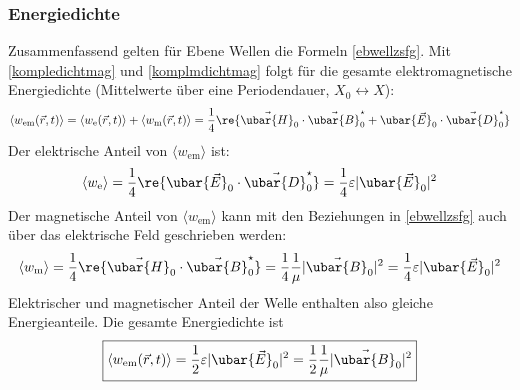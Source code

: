 	  \subsubsection{Energiedichte}
	  Zusammenfassend gelten für Ebene Wellen die Formeln \ref{ebwellzsfg}. Mit \ref{kompledichtmag} und \ref{komplmdichtmag} folgt für die gesamte elektromagnetische Energiedichte (Mittelwerte über eine Periodendauer, $X_0\leftrightarrow X$):
	  \begin{equation}
	  	\langle   w_\mathrm{em}(\vec{r} , t)\rangle = \langle   w_\mathrm{e}(\vec{r} , t)\rangle + \langle   w_\mathrm{m}(\vec{r} , t)\rangle = \frac{1}{4}\re{\vec{\ubar{H}}_0 \cdot \vec{\ubar{B}}_0^\star + \ubar{\vec{E}}_0 \cdot \vec{\ubar{D}}_0^\star}
	  \end{equation}
	  Der elektrische Anteil von \(\langle   w_\mathrm{em}\rangle\) ist: \begin{equation}
	  	\langle   w_\mathrm{e}\rangle  = \frac{1}{4}\re{\ubar{\vec{E}}_0 \cdot \vec{\ubar{D}}_0^\star} = \frac{1}{4} \varepsilon |\ubar{\vec{E}}_0|^2
	  \end{equation} 
	  Der magnetische Anteil von \(\langle   w_\mathrm{em}\rangle\) kann mit den Beziehungen in \ref{ebwellzsfg} auch über das elektrische Feld geschrieben werden: \begin{equation}
	  	\langle   w_\mathrm{m}\rangle  = \frac{1}{4}\re{\vec{\ubar{H}}_0 \cdot \vec{\ubar{B}}_0^\star} = \frac{1}{4} \frac{1}{\mu} |\vec{\ubar{B}}_0|^2 = \frac{1}{4} \varepsilon |\ubar{\vec{E}}_0|^2
	  \end{equation}  
	  Elektrischer und magnetischer Anteil der Welle enthalten also gleiche Energieanteile. Die gesamte Energiedichte ist
	  \begin{equation}
	  	\boxed{\langle   w_\mathrm{em}(\vec{r} , t)\rangle = \frac{1}{2} \varepsilon |\ubar{\vec{E}}_0|^2 = \frac{1}{2} \frac{1}{\mu} |\vec{\ubar{B}}_0|^2}
	  \end{equation}
